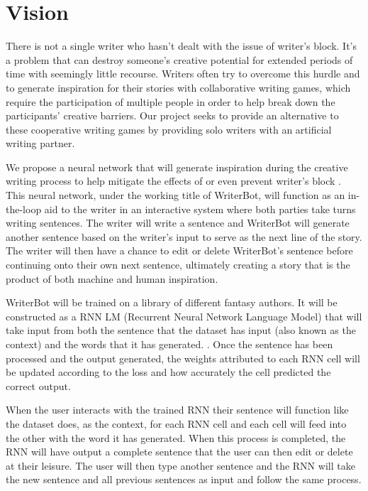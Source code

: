 \section{Vision}\label{sec:vison}
There is not a single writer who hasn’t dealt with the issue of writer's block.
It’s a problem that can destroy someone's creative potential for extended periods
of time with seemingly little recourse.  Writers often try to overcome this hurdle
and to generate inspiration for their stories with collaborative writing games,
which require the participation of multiple people in order to help break down
the participants’ creative barriers. Our project seeks to provide an alternative
to these cooperative writing games by providing solo writers with an artificial
writing partner.

We propose a neural network that will generate inspiration during the creative
writing process to help mitigate the effects of or even prevent writer's block
\cite{clark}. This neural network, under the working title of WriterBot, will
function as an in-the-loop aid to the writer in an interactive system where both
parties take turns writing sentences. The writer will write a sentence and
WriterBot will generate another sentence based on the writer’s input to serve
as the next line of the story. The writer will then have a chance to edit or
delete WriterBot’s sentence before continuing onto their own next sentence,
ultimately creating a story that is the product of both machine and human
inspiration.

WriterBot will be trained on a library of different fantasy authors. It will be
constructed as a RNN LM (Recurrent Neural Network Language Model) that will take
input from both the sentence that the dataset has input (also known as the context)
and the words that it has generated. \cite{RNN_language_model}. Once the sentence
has been processed and the output generated, the weights attributed to each RNN
cell will be updated according to the loss and how accurately the cell predicted
the correct output.

When the user interacts with the trained RNN their sentence will function like
the dataset does, as the context, for each RNN cell and each cell will feed into
the other with the word it has generated. When this process is completed, the RNN
will have output a complete sentence that the user can then edit or delete at their
leisure. The user will then type another sentence and the RNN will take the new
sentence and all previous sentences as input and follow the same process.

